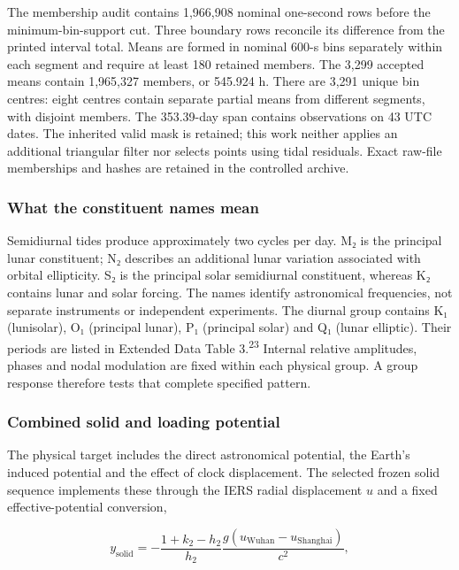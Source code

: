 \documentclass[
  10pt,
  a4paper,
]{article}
\begin{document}
The membership audit contains 1,966,908 nominal one-second rows before
the minimum-bin-support cut. Three boundary rows reconcile its
difference from the printed interval total. Means are formed in nominal
600-s bins separately within each segment and require at least 180
retained members. The 3,299 accepted means contain 1,965,327 members, or
545.924 h. There are 3,291 unique bin centres: eight centres contain
separate partial means from different segments, with disjoint members.
The 353.39-day span contains observations on 43 UTC dates. The inherited
valid mask is retained; this work neither applies an additional
triangular filter nor selects points using tidal residuals. Exact
raw-file memberships and hashes are retained in the controlled archive.

\hypertarget{what-the-constituent-names-mean}{%
\subsubsection{What the constituent names
mean}\label{what-the-constituent-names-mean}}

Semidiurnal tides produce approximately two cycles per day. M₂ is the
principal lunar constituent; N₂ describes an additional lunar variation
associated with orbital ellipticity. S₂ is the principal solar
semidiurnal constituent, whereas K₂ contains lunar and solar forcing.
The names identify astronomical frequencies, not separate instruments or
independent experiments. The diurnal group contains K₁ (lunisolar), O₁
(principal lunar), P₁ (principal solar) and Q₁ (lunar elliptic). Their
periods are listed in Extended Data Table 3.\textsuperscript{23}
Internal relative amplitudes, phases and nodal modulation are fixed
within each physical group. A group response therefore tests that
complete specified pattern.

\hypertarget{combined-solid-and-loading-potential}{%
\subsubsection{Combined solid and loading
potential}\label{combined-solid-and-loading-potential}}

The physical target includes the direct astronomical potential, the
Earth's induced potential and the effect of clock displacement. The
selected frozen solid sequence implements these through the IERS radial
displacement \(u\) and a fixed effective-potential conversion,

\[y_{\mathrm{solid}}=-\frac{1+k_2-h_2}{h_2}\frac{g(u_{\mathrm{Wuhan}}-u_{\mathrm{Shanghai}})}{c^2},\]
\end{document}
